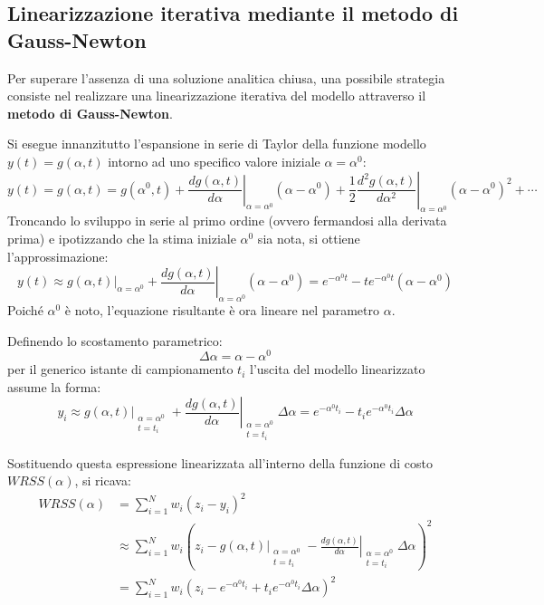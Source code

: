 \subsection{Linearizzazione iterativa mediante il metodo di Gauss-Newton}

Per superare l'assenza di una soluzione analitica chiusa, una possibile strategia consiste nel realizzare una linearizzazione iterativa del modello attraverso il \textbf{metodo di Gauss-Newton}.

Si esegue innanzitutto l'espansione in serie di Taylor della funzione modello $y(t) = g(\alpha, t)$ intorno ad uno specifico valore iniziale $\alpha = \alpha^{0}$:
\begin{equation}
y(t) = g(\alpha, t) = g(\alpha^{0}, t) + \left.\frac{dg(\alpha, t)}{d\alpha}\right|_{\alpha=\alpha^{0}} (\alpha - \alpha^{0}) + \frac{1}{2}\left.\frac{d^{2}g(\alpha, t)}{d\alpha^{2}}\right|_{\alpha=\alpha^{0}} (\alpha - \alpha^{0})^{2} + \cdots
\end{equation}
Troncando lo sviluppo in serie al primo ordine (ovvero fermandosi alla derivata prima) e ipotizzando che la stima iniziale $\alpha^{0}$ sia nota, si ottiene l'approssimazione:
\begin{equation}
y(t) \approx \left.g(\alpha, t)\right|_{\alpha=\alpha^{0}} + \left.\frac{dg(\alpha, t)}{d\alpha}\right|_{\alpha=\alpha^{0}} (\alpha - \alpha^{0}) = e^{-\alpha^{0} t} - t e^{-\alpha^{0} t} (\alpha - \alpha^{0})
\end{equation}
Poiché $\alpha^{0}$ è noto, l'equazione risultante è ora lineare nel parametro $\alpha$.

Definendo lo scostamento parametrico:
\begin{equation}
\Delta\alpha = \alpha - \alpha^{0}
\end{equation}
per il generico istante di campionamento $t_{i}$ l'uscita del modello linearizzato assume la forma:
\begin{equation}
y_{i} \approx \left.g(\alpha, t)\right|_{\substack{\alpha=\alpha^{0} \\ t=t_{i}}} + \left.\frac{dg(\alpha, t)}{d\alpha}\right|_{\substack{\alpha=\alpha^{0} \\ t=t_{i}}} \Delta\alpha = e^{-\alpha^{0} t_{i}} - t_{i} e^{-\alpha^{0} t_{i}} \Delta\alpha
\end{equation}

Sostituendo questa espressione linearizzata all'interno della funzione di costo $WRSS(\alpha)$, si ricava:
\begin{align}
WRSS(\alpha) &= \sum_{i=1}^{N} w_{i}(z_{i} - y_{i})^{2} \nonumber \\
&\approx \sum_{i=1}^{N} w_{i}\left(z_{i} - \left.g(\alpha, t)\right|_{\substack{\alpha=\alpha^{0} \\ t=t_{i}}} - \left.\frac{dg(\alpha, t)}{d\alpha}\right|_{\substack{\alpha=\alpha^{0} \\ t=t_{i}}} \Delta\alpha\right)^{2} \nonumber \\
&= \sum_{i=1}^{N} w_{i}\left(z_{i} - e^{-\alpha^{0} t_{i}} + t_{i} e^{-\alpha^{0} t_{i}} \Delta\alpha\right)^{2}
\end{align}

